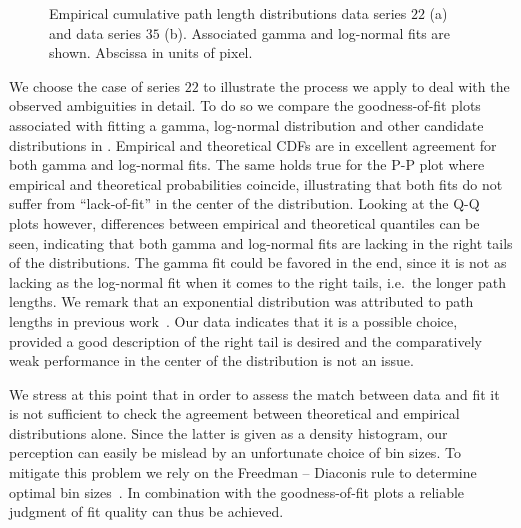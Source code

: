 		\begin{figure}
			\centering

			\caption[Path length distributions.]{Empirical cumulative path length distributions data series $22$ (a) and data series $35$ (b). Associated gamma and log-normal fits are shown. Abscissa in units of pixel.}
			\label{fig:path_lengths}
		\end{figure}

		We choose the case of series $22$ to illustrate the process we apply to deal with the observed ambiguities in detail. To do so we compare the goodness-of-fit plots associated with fitting a gamma, log-normal distribution and other candidate distributions in . Empirical and theoretical CDFs are in excellent agreement for both gamma and log-normal fits. The same holds true for the P-P plot where empirical and theoretical probabilities coincide, illustrating that both fits do not suffer from ``lack-of-fit'' in the center of the distribution. Looking at the Q-Q plots however, differences between empirical and theoretical quantiles can be seen, indicating that both gamma and log-normal fits are lacking in the right tails of the distributions. The gamma fit could be favored in the end, since it is not as lacking as the log-normal fit when it comes to the right tails, i.e.\ the longer path lengths. We remark that an exponential distribution was attributed to path lengths in previous work~\cite{baumgarten2010plasmodial}. Our data indicates that it is a possible choice, provided a good description of the right tail is desired and the comparatively weak performance in the center of the distribution is not an issue.

		We stress at this point that in order to assess the match between data and fit it is not sufficient to check the agreement between theoretical and empirical distributions alone. Since the latter is given as a density histogram, our perception can easily be mislead by an unfortunate choice of bin sizes. To mitigate this problem we rely on the Freedman – Diaconis rule to determine optimal bin sizes~\cite{freedman1981histogram}. In combination with the goodness-of-fit plots a reliable judgment of fit quality can thus be achieved. 

